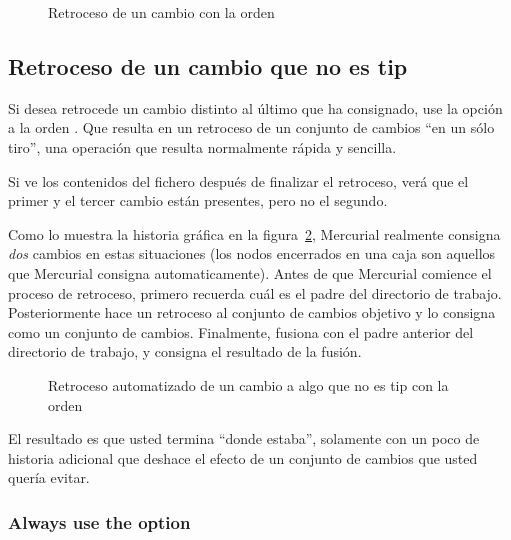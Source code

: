\begin{figure}[htb]
  \centering
  \caption{Retroceso de un cambio con la orden }
  \label{fig:undo:backout}
\end{figure}

\subsection{Retroceso de un cambio que no es tip}

Si desea retrocede un cambio distinto al último que ha consignado, use
la opción  a la orden .
Que resulta en un retroceso de un conjunto de cambios ``en un sólo
tiro'', una operación que resulta normalmente rápida y sencilla.

Si ve los contenidos del fichero  después de
finalizar el retroceso, verá que el primer y el tercer cambio están
presentes, pero no el segundo.

Como lo muestra la historia gráfica en la
figura~\ref{fig:undo:backout-non-tip}, Mercurial realmente consigna
\emph{dos} cambios en estas situaciones (los nodos encerrados en una
caja son aquellos que Mercurial consigna automaticamente).  Antes de
que Mercurial comience el proceso de retroceso, primero recuerda cuál
es el padre del directorio de trabajo.  Posteriormente hace un
retroceso al conjunto de cambios objetivo y lo consigna como un
conjunto de cambios. Finalmente, fusiona con el padre anterior del
directorio de trabajo, y consigna el resultado de la fusión.


\begin{figure}[htb]
  \centering
  \caption{Retroceso automatizado de un cambio a algo que no es tip con la orden }
  \label{fig:undo:backout-non-tip}
\end{figure}

El resultado es que usted termina ``donde estaba'', solamente con un
poco de historia adicional que deshace el efecto de un conjunto de
cambios que usted quería evitar.

\subsubsection{Always use the  option}

